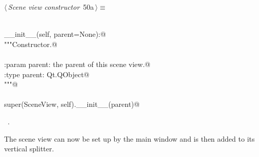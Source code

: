 \documentclass[
    a4paper,      %
    10pt,         %
    openright,    %
    notitlepage,  %
    parskip=half, %
]{scrreprt}       %
\theoremstyle{definition}                    %
\begin{document}
\begin{flushleft} \small
\begin{minipage}{\linewidth}\label{scrap73}\raggedright\small
{} $\langle\,${\itshape Scene view constructor}\nobreak\ {\footnotesize {50a}}$\,\rangle\equiv$
\vspace{-1exm}
\begin{list}{}{} \item
\mbox{}\lstinline@@\\
\mbox{}\lstinline@def __init__(self, parent=None):@\\
\mbox{}\lstinline@    """Constructor.@\\
\mbox{}\lstinline@@\\
\mbox{}\lstinline@    :param parent: the parent of this scene view.@\\
\mbox{}\lstinline@    :type parent: Qt.QObject@\\
\mbox{}\lstinline@    """@\\
\mbox{}\lstinline@@\\
\mbox{}\lstinline@    super(SceneView, self).__init__(parent)@\\
\mbox{}\lstinline@@{\NWsep}
\end{list}
\vspace{-1.5ex}
\footnotesize
\begin{list}{}{\setlength{\itemsep}{-\parsep}\setlength{\itemindent}{-\leftmargin}}
\item \NWtxtMacroRefIn\ .

\item{}
\end{list}
\end{minipage}\vspace{4ex}
\end{flushleft}
The scene view can now be set up by the main window and is then added to its
vertical splitter.
\end{document}
